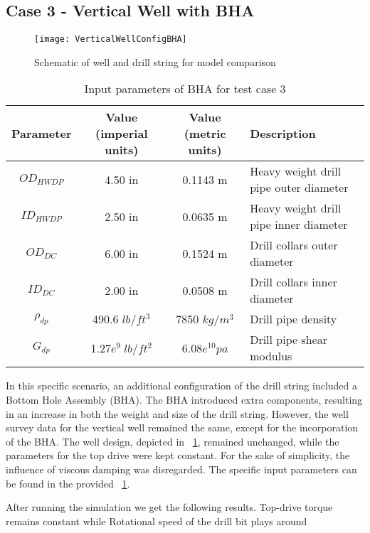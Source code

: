 \newpage
\subsection{Case 3 - Vertical Well with BHA}

\begin{figure}[!hbt]
  \centering
  \texttt{[image: VerticalWellConfigBHA]}
  \caption{Schematic of well and drill string for model comparison}\label{Vert_well_conf_BHA}
\end{figure}


\begin{table}
  \centering
  \begin{tabular}{|c|c|c|p{2.2in}|}
    \hline
    Parameter & Value (imperial units) & Value (metric units) & Description \\
    \hline
    $OD_{HWDP}$ & 4.50 in & 0.1143 m & Heavy weight drill pipe outer diameter \\
    \hline
    $ID_{HWDP}$ & 2.50 in & 0.0635 m & Heavy weight drill pipe inner diameter \\
    \hline
    $OD_{DC}$ & 6.00 in & 0.1524 m & Drill collars outer diameter \\
    \hline
    $ID_{DC}$ & 2.00 in & 0.0508 m & Drill collars inner diameter \\
    \hline
    $\rho_{dp}$ & 490.6 $lb/ft^{3}$ & 7850 $kg/m^{3}$ & Drill pipe density \\
    \hline
    $G_{dp}$ & 1.27$e^{9}\;lb/ft^{2}$ & 6.08$e^{10} pa$ & Drill pipe shear modulus \\
    \hline
  \end{tabular}
  \caption{Input parameters of BHA for test case 3}\label{Input Parameters TC3}
\end{table} 

In this specific scenario, an additional configuration of the drill string included a Bottom Hole Assembly (BHA). The BHA introduced extra components, resulting in an increase in both the weight and size of the drill string. However, the well survey data for the vertical well remained the same, except for the incorporation of the BHA. The well design, depicted in \figurename~\ref{Vert_well_conf_BHA}, remained unchanged, while the parameters for the top drive were kept constant. For the sake of simplicity, the influence of viscous damping was disregarded. The specific input parameters can be found in the provided \tablename~\ref{Input Parameters TC3}.

After running the simulation we get the following results. Top-drive torque remains constant while Rotational speed of the drill bit plays around
